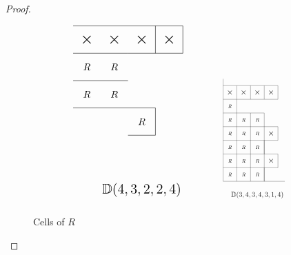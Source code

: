 \documentclass[letterpaper,10pt]{article}
\begin{document}
\begin{proof}
\begin{figure}[H]
$${\begin{tikzpicture}
            \node at (2.5,1.5) {$R$};
            \draw (0,2)--(3,2)--(3,1)--(2,1);
            \node at (0.5,2.5) {$R$};
            \node at (1.5,2.5) {$R$};
            \draw (0,3)--(2,3);
            \node at (0.5,3.5) {$R$};
            \node at (1.5,3.5) {$R$};
            \draw (0,4)--(2,4);
            \node at (0.5,4.5) {$\bigtimes$};
            \node at (1.5,4.5) {$\bigtimes$};
            \node at (2.5,4.5) {$\bigtimes$};
            \node at (3.5,4.5) {$\bigtimes$};
            \draw (0,5)--(4,5)--(4,4)--(2,4);
            \draw (3,4)--(3,5);
            \node at (2.5,-1) {\Large $\mathbb{D}(4,3,2,2,4)$};
        \end{tikzpicture}}\quad\quad\quad\quad \scalebox{0.5}{\begin{tikzpicture}
            \draw (0,7.5)--(0,0)--(4.5,0);
            \node at (0.5,0.5) {$R$};
            \node at (1.5,0.5) {$R$};
            \node at (2.5,0.5) {$R$};
            \draw (0,1)--(3,1)--(3,0);
            \draw (1,0)--(1,7);
            \draw (2,0)--(2,5);
            \draw (3,0)--(3,5);
            \node at (0.5,1.5) {$R$};
            \node at (1.5,1.5) {$R$};
            \node at (2.5,1.5) {$R$};
            \node at (3.5,1.5) {$\bigtimes$};
            \draw (0,2)--(4,2)--(4,1)--(3,1);
            \node at (0.5,2.5) {$R$};
            \node at (1.5,2.5) {$R$};
            \node at (2.5,2.5) {$R$};
            \draw (0,3)--(3,3)--(3,2);
            \node at (0.5,3.5) {$R$};
            \node at (1.5,3.5) {$R$};
            \node at (2.5,3.5) {$R$};
            \node at (3.5,3.5) {$\bigtimes$};
            \draw (0,4)--(4,4)--(4,3)--(3,3);
            \node at (0.5,4.5) {$R$};
            \node at (1.5,4.5) {$R$};
            \node at (2.5,4.5) {$R$};
            \draw (0,5)--(3,5);
            \draw (0,6)--(1,6);
            \node at (0.5,5.5) {$R$};
            \node at (0.5,6.5) {$\bigtimes$};
            \node at (1.5,6.5) {$\bigtimes$};
            \node at (2.5,6.5) {$\bigtimes$};
            \node at (3.5,6.5) {$\bigtimes$};
            \draw (0,7)--(4,7)--(4,6)--(1,6);
            \draw (2,6)--(2,7);
            \draw (3,6)--(3,7);
            \node at (2.5,-1) {\Large $\mathbb{D}(3,4,3,4,3,1,4)$};
        \end{tikzpicture}}$$
        \caption{Cells of $R$}
        \label{fig:Rboxes}
    \end{figure}
    

\end{proof}
\end{document}

